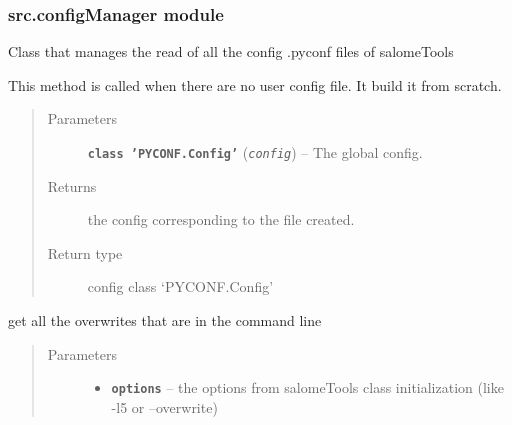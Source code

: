 \documentclass[a4paper,10pt,english]{sphinxmanual}
\begin{document}
\subsubsection{src.configManager module}
\label{commands/apidoc/src:module-src.configManager}\label{commands/apidoc/src:src-configmanager-module}

\begin{fulllineitems}
\label{commands/apidoc/src:src.configManager.ConfigManager}
Class that manages the read of all the config .pyconf files of salomeTools

\begin{fulllineitems}
\label{commands/apidoc/src:src.configManager.ConfigManager.create_config_file}
This method is called when there are no user config file. 
It build it from scratch.
\begin{quote}\begin{description}
\item[{Parameters}] \leavevmode
\textbf{\texttt{class 'PYCONF.Config'}} (\emph{\texttt{config}}) -- The global config.

\item[{Returns}] \leavevmode
the config corresponding to the file created.

\item[{Return type}] \leavevmode
config class `PYCONF.Config'

\end{description}\end{quote}

\end{fulllineitems}


\begin{fulllineitems}
\label{commands/apidoc/src:src.configManager.ConfigManager.get_command_line_overrides}
get all the overwrites that are in the command line
\begin{quote}\begin{description}
\item[{Parameters}] \leavevmode\begin{itemize}
\item {} 
\textbf{\texttt{options}} -- the options from salomeTools class 
initialization (like -l5 or --overwrite)


\end{itemize}
\end{description}
\end{quote}
\end{fulllineitems}
\end{fulllineitems}
\end{document}
